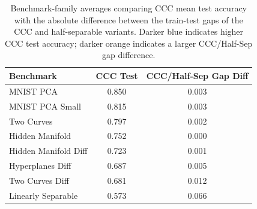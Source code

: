\begin{table}[H]
\centering
\small
\setlength{\tabcolsep}{5pt}
\begin{tabular}{l|c|c}
\hline
\rowcolor{gray!20}
Benchmark & CCC Test & CCC/Half-Sep Gap Diff \\
\hline
MNIST PCA            & \cellcolor{blue!85}0.850 & \cellcolor{orange!5}0.003 \\
MNIST PCA Small      & \cellcolor{blue!73}0.815 & \cellcolor{orange!5}0.003 \\
\rowcolor{gray!4}
Two Curves           & \cellcolor{blue!69}0.797 & \cellcolor{orange!5}0.002 \\
Hidden Manifold      & \cellcolor{blue!58}0.752 & \cellcolor{orange!3}0.000 \\
\rowcolor{gray!4}
Hidden Manifold Diff & \cellcolor{blue!50}0.723 & \cellcolor{orange!4}0.001 \\
Hyperplanes Diff     & \cellcolor{blue!39}0.687 & \cellcolor{orange!6}0.005 \\
\rowcolor{gray!4}
Two Curves Diff      & \cellcolor{blue!37}0.681 & \cellcolor{orange!11}0.012 \\
Linearly Separable   & \cellcolor{blue!20}0.573 & \cellcolor{orange!45}0.066 \\
\hline
\end{tabular}
\caption{Benchmark-family averages comparing CCC mean test accuracy with the absolute difference between the train-test gaps of the CCC and half-separable variants. Darker blue indicates higher CCC test accuracy; darker orange indicates a larger CCC/Half-Sep gap difference.}
\label{tab:ccc-halfsep-gap-relation}
\end{table}

